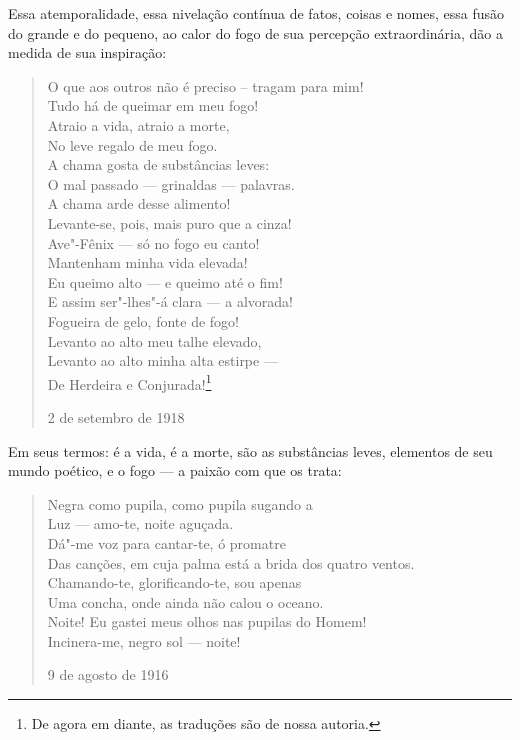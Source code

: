 Essa atemporalidade, essa nivelação contínua de fatos, coisas e
nomes, essa fusão do grande e do pequeno, ao calor do fogo de sua
percepção extraordinária, dão a medida de sua inspiração:

\begin{verse}
O que aos outros não é preciso -- tragam \qb{}para mim! \\
Tudo há de queimar em meu fogo! \\
Atraio a vida, atraio a morte, \\
No leve regalo de meu fogo. \\[8pt]
A chama gosta de substâncias leves: \\
O mal passado --- grinaldas --- palavras. \\
A chama arde desse alimento! \\
Levante-se, pois, mais puro que a cinza! \\[8pt]
Ave"-Fênix --- só no fogo eu canto! \\
Mantenham minha vida elevada! \\
Eu queimo alto --- e queimo até o fim! \\
E assim ser"-lhes"-á clara --- a alvorada! \\[8pt]
Fogueira de gelo, fonte de fogo! \\
Levanto ao alto meu talhe elevado, \\
Levanto ao alto minha alta estirpe --- \\
De Herdeira e Conjurada!\footnote{De agora em diante, as traduções são de nossa autoria.}

2 de setembro de 1918

\end{verse}

Em seus termos: é a vida, é a morte, são as substâncias leves,
elementos de seu mundo poético, e o fogo --- a paixão com que os
trata:

\begin{verse}
Negra como pupila, como pupila sugando a \\
Luz --- amo-te, noite aguçada. \\[8pt]
Dá"-me voz para cantar-te, ó promatre \\
Das canções, em cuja palma está a brida \qb{}dos quatro ventos. \\[8pt]
Chamando-te, glorificando-te, sou apenas \\
Uma concha, onde ainda não calou o oceano. \\[8pt]
Noite! Eu gastei meus olhos nas pupilas \qb{}do Homem! \\
Incinera-me, negro sol --- noite!

9 de agosto de 1916
\end{verse}

